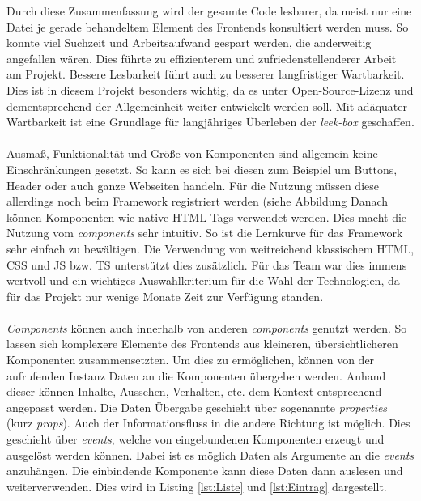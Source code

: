 \documentclass[10pt, a4paper]{article}
\begin{document}
Durch diese Zusammenfassung wird der gesamte Code lesbarer,
 da meist nur eine Datei je gerade behandeltem Element des Frontends konsultiert werden muss.
So konnte viel Suchzeit und Arbeitsaufwand gespart werden, die anderweitig angefallen wären.
Dies führte zu effizienterem und zufriedenstellenderer Arbeit am Projekt.
Bessere Lesbarkeit führt auch zu besserer langfristiger Wartbarkeit.
Dies ist in diesem Projekt besonders wichtig,
 da es unter Open-Source-Lizenz und dementsprechend der Allgemeinheit weiter entwickelt werden soll.
Mit adäquater Wartbarkeit ist eine Grundlage für langjähriges Überleben der \textit{leek-box} geschaffen.
\\~\\
Ausmaß, Funktionalität und Größe von Komponenten sind allgemein keine Einschränkungen gesetzt.
So kann es sich bei diesen zum Beispiel um Buttons, Header oder auch ganze Webseiten handeln.
Für die Nutzung müssen diese allerdings noch beim Framework registriert werden
(siehe Abbildung %
Danach können Komponenten wie native HTML-Tags verwendet werden.
Dies macht die Nutzung vom \textit{components} sehr intuitiv.
So ist die Lernkurve für das Framework sehr einfach zu bewältigen.
Die Verwendung von weitreichend klassischem HTML, CSS und JS bzw. TS unterstützt dies zusätzlich.
Für das Team war dies immens wertvoll und ein wichtiges Auswahlkriterium für die Wahl der Technologien,
 da für das Projekt nur wenige Monate Zeit zur Verfügung standen.
\\~\\
\textit{Components} können auch innerhalb von anderen \textit{components} genutzt werden.
So lassen sich komplexere Elemente des Frontends aus kleineren, übersichtlicheren Komponenten zusammensetzten.
Um dies zu ermöglichen, können von der aufrufenden Instanz Daten an die Komponenten übergeben werden.
Anhand dieser können Inhalte, Aussehen, Verhalten, etc. dem Kontext entsprechend angepasst werden.
Die Daten Übergabe geschieht über sogenannte \textit{properties} (kurz \textit{props}).
Auch der Informationsfluss in die andere Richtung ist möglich.
Dies geschieht über \textit{events}, welche von eingebundenen Komponenten erzeugt und ausgelöst werden können.
Dabei ist es möglich Daten als Argumente an die \textit{events} anzuhängen.
Die einbindende Komponente kann diese Daten dann auslesen und weiterverwenden.
Dies wird in Listing \ref{lst:Liste} und \ref{lst:Eintrag} dargestellt.
\end{document}
